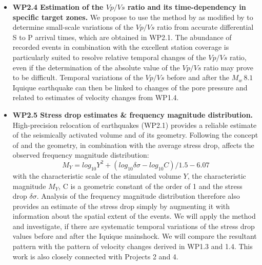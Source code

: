 \documentclass[11pt]{article}
\newcommand{\note}[1]{{\it \color{red} #1}}
\newcommand{\noteft}[1]{{\it \color{magenta} FT:#1}}
\newcommand{\note}[1]{}
\newcommand{\noteft}[1]{}
\begin{document}
\begin{itemize}
\item
	{\bf WP2.4 Estimation of the $Vp/Vs$ ratio and its time-dependency in specific target zones.}
We propose to use the method by \cite{Lin2007} as modified by \citet{bloch:2014a} to determine small-scale variations of the $Vp/Vs$ ratio from accurate differential S to P arrival times, which are obtained in WP2.1. 
	The abundance of recorded events in combination with the excellent station coverage is particularly suited to resolve relative temporal changes of the $Vp/Vs$ ratio, even if the determination of the absolute value of the $Vp/Vs$ ratio may prove to be difficult.
	Temporal variations of the $Vp/Vs$ before and after the $M_w\,8.1$ Iquique earthquake can then be linked to changes of the pore pressure and related to estimates of velocity changes from WP1.4. 
\item
	{\bf WP2.5 Stress drop estimates \& frequency magnitude distribution.}
High-precision relocation of earthquakes (WP2.1) provides a reliable estimate of the seismically activated volume and of its geometry. Following the concept of \citet{shapiro:2011} and \citet{Shapiro2013} the geometry, in combination with the average stress drop, affects the observed frequency magnitude distribution:
\begin{equation}
	M_Y= log_{10} Y^2 +(log_{10} \delta\sigma -log_{10} C)/1.5 -6.07
\end{equation}
with the characteristic scale of the stimulated volume $Y$, the characteristic magnitude $M_Y$, C
is a geometric constant of the order of 1 and the stress drop $\delta\sigma$.
Analysis of the frequency magnitude distribution therefore also provides an estimate of the stress drop simply by augmenting it with information about the spatial extent of the events.
We will apply the method and investigate, if there are systematic temporal variations of the stress drop values before and after the Iquique mainshock. We will compare the resultant pattern with the pattern of velocity changes derived in WP1.3 and 1.4.  This work is also closely connected with Projects 2 and 4.
\end{itemize}
\end{document}
